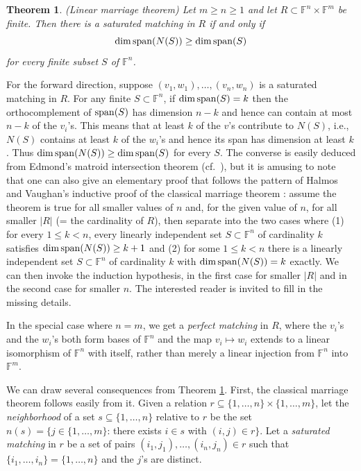 \documentclass{amsart}
\newtheorem{thm}{Theorem}[section]
\theoremstyle{definition}
\begin{document}
\begin{thm}\label{qhmt} (Linear marriage theorem)
Let $m \geq n \geq 1$ and let $R \subset \mathbb{F}^n \times \mathbb{F}^m$ be finite. Then there is a saturated matching in $R$ if and only if $${\rm dim}\, {\rm span}(N(S)) \geq {\rm dim}\, {\rm span}(S)$$ for every finite subset $S$ of $\mathbb{F}^n$.
\end{thm}

For the forward direction, suppose $(v_1, w_1), \ldots, (v_n,w_n)$ is a saturated matching in $R$. For any finite $S \subset \mathbb{F}^n$, if ${\rm dim}\, {\rm span}(S) = k$ then the orthocomplement of ${\rm span}(S)$ has dimension $n - k$ and hence can contain at most $n - k$ of the $v_i$'s. This means that at least $k$ of the $v$'s contribute to $N(S)$, i.e., $N(S)$ contains at least $k$ of the $w_i$'s and hence its span has dimension at least $k$. Thus ${\rm dim}\, {\rm span}(N(S)) \geq {\rm dim}\, {\rm span}(S)$ for every $S$. The converse is easily deduced from Edmond's matroid intersection theorem \cite[Theorem (69)]{edmonds} (cf.\ \cite[Theorem 1*]{lovasz}), but it is amusing to note that one can also give an elementary proof that follows the pattern of Halmos and Vaughan's inductive proof of the classical marriage theorem \cite{HV}: assume the theorem is true for all smaller values of $n$ and, for the given value of $n$, for all smaller $|R|$ (= the cardinality of $R$), then separate into the two cases where (1) for every $1 \leq k < n$, every linearly independent set $S \subset \mathbb{F}^n$ of cardinality $k$ satisfies ${\rm dim}\, {\rm span}(N(S)) \geq k + 1$ and (2) for some $1 \leq k < n$ there is a linearly independent set $S \subset \mathbb{F}^n$ of cardinality $k$ with ${\rm dim}\, {\rm span}(N(S)) = k$ exactly. We can then invoke the induction hypothesis, in the first case for smaller $|R|$ and in the second case for smaller $n$. The interested reader is invited to fill in the missing details.

In the special case where $n = m$, we get a {\it perfect matching} in $R$, where the $v_i$'s and the $w_i$'s both form bases of $\mathbb{F}^n$ and the map $v_i \mapsto w_i$ extends to a linear isomorphism of $\mathbb{F}^n$ with itself, rather than merely a linear injection from $\mathbb{F}^n$ into $\mathbb{F}^m$.

We can draw several consequences from Theorem \ref{qhmt}. First, the classical marriage theorem follows easily from it. Given a relation $r \subseteq \{1, \ldots, n\} \times \{1, \ldots, m\}$, let the {\it neighborhood} of a set $s \subseteq \{1, \ldots, n\}$ relative to $r$ be the set $n(s) = \{j \in \{1, \ldots, m\}$: there exists $i \in s$ with $(i,j) \in r\}$. Let a {\it saturated matching} in $r$ be a set of pairs $(i_1, j_1), \ldots, (i_n, j_n) \in r$ such that $\{i_1, \ldots, i_n\} = \{1, \ldots, n\}$ and the $j$'s are distinct.
\end{document}
